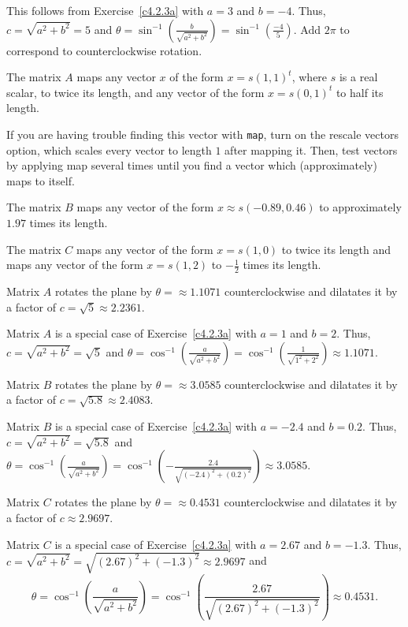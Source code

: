 \soln This follows from Exercise~\ref{c4.2.3a} with $a = 3$
and $b = -4$.  Thus, $c = \sqrt{a^2 + b^2} = 5$ and
$\theta = \sin^{-1}\left(\frac{b}{\sqrt{a^2 + b^2}}\right) = 
\sin^{-1}\left(\frac{-4}{5}\right)$.  Add $2\pi$ to correspond to counterclockwise rotation.

 The matrix $A$ maps any vector $x$ of the form
$x = s(1,1)^t$, where $s$ is a real scalar, to twice its length, and any
vector of the form $x = s(0,1)^t$ to half its length.

\para If you are having trouble finding this vector with {\tt map},
turn on the rescale vectors option, which scales every vector to length
$1$ after mapping it.  Then, test vectors by applying {\sf map} several
times until you find a vector which (approximately) maps to itself.

\newpage
{} The matrix $B$ maps any vector of the form
$x \approx s(-0.89,0.46)$ to approximately $1.97$ times its length.

 The matrix $C$ maps any vector of the form $x = s(1,0)$
to twice its length and maps any vector of the form $x = s(1,2)$ to
$-\frac{1}{2}$ times its length.

 \ans Matrix $A$ rotates the plane by $\theta =
\approx 1.1071$ counterclockwise and dilatates it by a factor of
$c = \sqrt{5} \approx 2.2361$.

\soln Matrix $A$ is a special case of Exercise~\ref{c4.2.3a} with $a = 1$
and $b = 2$.  Thus, $c = \sqrt{a^2 + b^2} = \sqrt{5}$ and
$\theta = \cos^{-1}\left(\frac{a}{\sqrt{a^2 + b^2}}\right) =
\cos^{-1}\left(\frac{1}{\sqrt{1^2 + 2^2}}\right) \approx 1.1071$.

 \ans Matrix $B$ rotates the plane by $\theta =
\approx 3.0585$ counterclockwise and dilatates it by a factor of
$c = \sqrt{5.8} \approx 2.4083$.

\soln Matrix $B$ is a special case of Exercise~\ref{c4.2.3a} with $a = -2.4$
and $b = 0.2$.  Thus, $c = \sqrt{a^2 + b^2} = \sqrt{5.8}$ and
$\theta = \cos^{-1}\left(\frac{a}{\sqrt{a^2 + b^2}}\right) =
\cos^{-1}\left(-\frac{2.4}{\sqrt{(-2.4)^2 + (0.2)^2}}\right) \approx 3.0585$.

 \ans Matrix $C$ rotates the plane by $\theta =
\approx 0.4531$ counterclockwise and dilatates it by a factor of
$c \approx 2.9697$.

\soln Matrix $C$ is a special case of Exercise~\ref{c4.2.3a} with $a = 2.67$
and $b = -1.3$.  Thus, $c = \sqrt{a^2 + b^2} = \sqrt{(2.67)^2 + (-1.3)^2}
\approx 2.9697$ and
\[
\theta = \cos^{-1}\left(\frac{a}{\sqrt{a^2 + b^2}}
\right) = \cos^{-1}\left(\frac{2.67}{\sqrt{(2.67)^2 + (-1.3)^2}}\right)
\approx 0.4531.
\]

